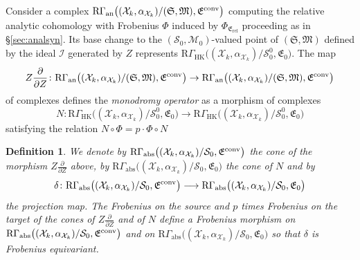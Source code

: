 \documentclass[asterisque,english]{smfart}
\newtheorem{definition}{Definition}[]
\begin{document}
Consider a complex $ \mathrm{R}\Gamma_{\mathrm{an}}\bigl((\mathcal{X}_k,\alpha_{\mathcal{X}_k})/(\mathfrak{S},\mathfrak{M}),\mathfrak{E}^{\rm conv}\bigr)$ computing the relative analytic cohomology with  Frobenius $\Phi$ induced by $\Phi_{\mathfrak{E}_{\mathrm{rel}}}$ proceeding as in \S \ref{sec:analsyn}.  Its base change to the $(\mathcal{S}_0,\mathcal{M}_0)$-valued point of $(\mathfrak{S},\mathfrak{M})$ defined by the ideal $\mathcal{I}$ generated by $Z$ represents $\mathrm{R}\Gamma_{\mathrm{HK}}\bigl((\mathcal{X}_k,\alpha_{\mathcal{X}_k})/ \mathcal{S}_0^0,\mathfrak{E}_0\bigr)$. The map $$Z \frac{\partial}{\partial Z}\colon \mathrm{R}\Gamma_{\mathrm{an}}\bigl((\mathcal{X}_k,\alpha_{\mathcal{X}_k})/(\mathfrak{S},\mathfrak{M}),\mathfrak{E}^{\rm conv}\bigr) \to \mathrm{R}\Gamma_{\mathrm{an}}\bigl((\mathcal{X}_k,\alpha_{\mathcal{X}_k})/(\mathfrak{S},\mathfrak{M}),\mathfrak{E}^{\rm conv}\bigr)$$of complexes defines the {\em monodromy operator} as a morphism of complexes $$N\colon \mathrm{R}\Gamma_{\mathrm{HK}}\bigl((\mathcal{X}_k,\alpha_{\mathcal{X}_k})/ \mathcal{S}_0^0,\mathfrak{E}_0\bigr) \longrightarrow \mathrm{R}\Gamma_{\mathrm{HK}}\bigl((\mathcal{X}_k,\alpha_{\mathcal{X}_k})/  \mathcal{S}_0^0,\mathfrak{E}_0\bigr)$$satisfying the relation $ N \circ \Phi=p \cdot \Phi \circ N$

\begin{definition}\label{def:abs} We denote by $ \mathrm{R}\Gamma_{\mathrm{abs}}\bigl((\mathcal{X}_k,\alpha_{\mathcal{X}_k})/\mathcal{S}_0,\mathfrak{E}^{\rm conv}\bigr) $ the cone of the morphism $Z \frac{\partial}{\partial Z}$ above, by $\mathrm{R}\Gamma_{\mathrm{abs}}\bigl((\mathcal{X}_k,\alpha_{\mathcal{X}_k})/\mathcal{S}_0,\mathfrak{E}_0\bigr) $ the cone of  $N$ and by $$\delta\colon \mathrm{R}\Gamma_{\mathrm{abs}}\bigl((\mathcal{X}_k,\alpha_{\mathcal{X}_k})/\mathcal{S}_0,\mathfrak{E}^{\rm conv}\bigr) \longrightarrow \mathrm{R}\Gamma_{\mathrm{abs}}\bigl((\mathcal{X}_k,\alpha_{\mathcal{X}_k})/\mathcal{S}_0,\mathfrak{E}_0\bigr) $$the projection map.  The Frobenius on the source and $p$ times Frobenius on the target of the cones of $Z \frac{\partial}{\partial Z}$ and of $N$  define a Frobenius morphism on  $ \mathrm{R}\Gamma_{\mathrm{abs}}\bigl((\mathcal{X}_k,\alpha_{\mathcal{X}_k})/\mathcal{S}_0,\mathfrak{E}^{\rm conv}\bigr) $  and on   $\mathrm{R}\Gamma_{\mathrm{abs}}\bigl((\mathcal{X}_k,\alpha_{\mathcal{X}_k})/\mathcal{S}_0,\mathfrak{E}_0\bigr) $ so that $\delta$ is Frobenius equivariant.

\end{definition}
\end{document}
